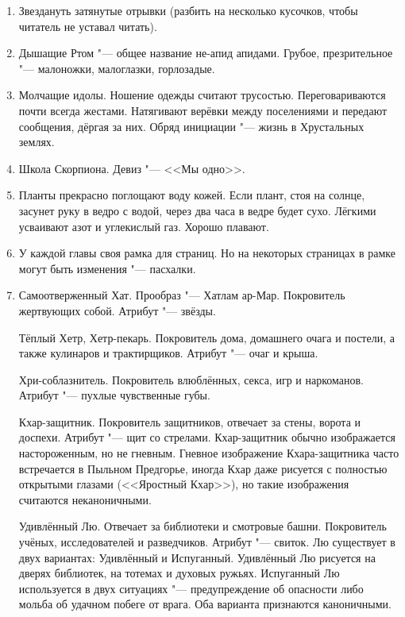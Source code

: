 \begin{enumerate}
\item Звездануть затянутые отрывки (разбить на несколько кусочков, чтобы читатель не уставал читать).

\item Дышащие Ртом "--- общее название не-апид апидами.
Грубое, презрительное "--- малоножки, малоглазки, горлозадые.

\item Молчащие идолы.
Ношение одежды считают трусостью.
Переговариваются почти всегда жестами.
Натягивают верёвки между поселениями и передают сообщения, дёргая за них.
Обряд инициации "--- жизнь в Хрустальных землях.

\item Школа Скорпиона.
Девиз "--- <<Мы одно>>.

\item Планты прекрасно поглощают воду кожей.
Если плант, стоя на солнце, засунет руку в ведро с водой, через два часа в ведре будет сухо.
Лёгкими усваивают азот и углекислый газ.
Хорошо плавают.

\item У каждой главы своя рамка для страниц.
Но на некоторых страницах в рамке могут быть изменения "--- пасхалки.

\item Самоотверженный Хат.
Прообраз "--- Хатлам ар-Мар.
Покровитель жертвующих собой.
Атрибут "--- звёзды.

Тёплый Хетр, Хетр-пекарь.
Покровитель дома, домашнего очага и постели, а также кулинаров и трактирщиков.
Атрибут "--- очаг и крыша.

Хри-соблазнитель.
Покровитель влюблённых, секса, игр и наркоманов.
Атрибут "--- пухлые чувственные губы.

Кхар-защитник.
Покровитель защитников, отвечает за стены, ворота и доспехи.
Атрибут "--- щит со стрелами.
Кхар-защитник обычно изображается настороженным, но не гневным.
Гневное изображение Кхара-защитника часто встречается в Пыльном Предгорье, иногда Кхар даже рисуется с полностью открытыми глазами (<<Яростный Кхар>>), но такие изображения считаются неканоничными.

Удивлённый Лю.
Отвечает за библиотеки и смотровые башни.
Покровитель учёных, исследователей и разведчиков.
Атрибут "--- свиток.
Лю существует в двух вариантах: Удивлённый и Испуганный.
Удивлённый Лю рисуется на дверях библиотек, на тотемах и духовых ружьях.
Испуганный Лю используется в двух ситуациях "--- предупреждение об опасности либо мольба об удачном побеге от врага.
Оба варианта признаются каноничными.


\end{enumerate}
